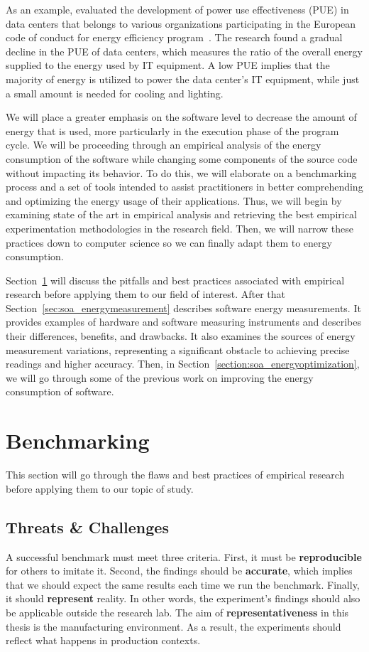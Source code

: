 As an example, \citeauthor{avgerinou_trends_2017} evaluated the development of power use effectiveness (PUE) in data centers that belongs to various organizations participating in the European code of conduct for energy efficiency program~\cite{avgerinou_trends_2017}.
The research found a gradual decline in the PUE of data centers, which measures the ratio of the overall energy supplied to the energy used by IT equipment.
A low PUE implies that the majority of energy is utilized to power the data center's IT equipment, while just a small amount is needed for cooling and lighting.

We will place a greater emphasis on the software level to decrease the amount of energy that is used, more particularly in the execution phase of the program cycle.
We will be proceeding through an empirical analysis of the energy consumption of the software while changing some components of the source code without impacting its behavior.
To do this, we will elaborate on a benchmarking process and a set of tools intended to assist practitioners in better comprehending and optimizing the energy usage of their applications.
Thus, we will begin by examining state of the art in empirical analysis and retrieving the best empirical experimentation methodologies in the research field. Then, we will narrow these practices down to computer science so we can finally adapt them to energy consumption.

Section~\ref{sec:soa_benchmarking} will discuss the pitfalls and best practices associated with empirical research before applying them to our field of interest.
After that Section~\ref{sec:soa_energymeasurement} describes software energy measurements.
It provides examples of hardware and software measuring instruments and describes their differences, benefits, and drawbacks. It also examines the sources of energy measurement variations, representing a significant obstacle to achieving precise readings and higher accuracy.
Then, in Section~\ref{section:soa_energyoptimization}, we will go through some of the previous work on improving the energy consumption of software.

\newpage
\section{Benchmarking}\label{sec:soa_benchmarking}
This section will go through the flaws and best practices of empirical research before applying them to our topic of study.

\subsection{Threats \& Challenges}
A successful benchmark must meet three criteria.
First, it must be \textbf{reproducible} for others to imitate it.
Second, the findings should be \textbf{accurate}, which implies that we should expect the same results each time we run the benchmark.
Finally, it should \textbf{represent} reality.
In other words, the experiment's findings should also be applicable outside the research lab.
The aim of \textbf{representativeness} in this thesis is the manufacturing environment.
As a result, the experiments should reflect what happens in production contexts.

